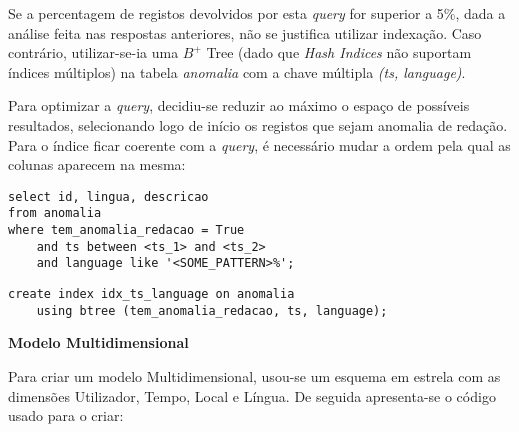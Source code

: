 \documentclass[12pt]{report}
\begin{document}
    \par Se a percentagem de registos devolvidos por esta \textit{query} for superior a 5\%, dada a análise feita nas respostas anteriores, não se justifica utilizar indexação. Caso contrário, utilizar-se-ia uma $B^+$ Tree (dado que \textit{Hash Indices} não suportam índices múltiplos) na tabela \textit{anomalia} com a chave múltipla \textit{(ts, language)}.
    \par Para optimizar a \textit{query}, decidiu-se reduzir ao máximo o espaço de possíveis resultados, selecionando logo de início os registos que sejam anomalia de redação. Para o índice ficar coerente com a \textit{query}, é necessário mudar a ordem pela qual as colunas aparecem na mesma:
    \footnotesize
    \begin{verbatim}
select id, lingua, descricao
from anomalia
where tem_anomalia_redacao = True
    and ts between <ts_1> and <ts_2>
    and language like '<SOME_PATTERN>%';
    \end{verbatim}
    \normalsize


    \footnotesize \begin{verbatim}
create index idx_ts_language on anomalia
    using btree (tem_anomalia_redacao, ts, language);
    \end{verbatim}\normalsize

    \Large
    \textbf{Modelo Multidimensional}\\
    \normalsize
    \par Para criar um modelo Multidimensional, usou-se um esquema em estrela com as dimensões Utilizador, Tempo, Local e Língua. De seguida apresenta-se o código usado para o criar:
\end{document}
